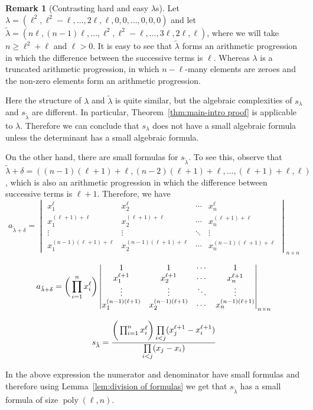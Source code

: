\documentclass[10pt,a4paper]{article}
\theoremstyle{definition}
\newtheorem{remark}[theorem]{Remark}
\DeclareMathOperator{\poly}{poly}
\begin{document}
%

%
%
%
%
%
%
%

\begin{remark}[Contrasting hard and easy $\lambda$s]
\label{rem:easy-hard-lambda}
Let $\lambda = (\ell^2, \ell^2-\ell, \ldots, 2\ell, \ell, 0, 0, \ldots, 0,0,0)$ and let $\tilde{\lambda} = ( n\ell, (n-1)\ell, \ldots, \ell^2,\ell^2-\ell, \ldots, 3\ell, 2\ell, \ell)$, where we will take $n \geq \ell^2+\ell$ and $\ell>0$. It is easy to see that $\tilde{\lambda}$ forms an arithmetic progression in which the difference between the successive terms is $\ell$. Whereas $\lambda$ is a truncated arithmetic progression, in which  $n-\ell$-many elements are zeroes and the non-zero elements form an arithmetic progression. 

Here the structure of $\lambda$ and $\tilde{\lambda}$ is quite similar, but the algebraic complexities of $s_\lambda$ and $s_{\tilde{\lambda}}$ are  different. 
In particular, Theorem~\ref{thm:main-intro proof} is applicable to $\lambda$. Therefore we can conclude that $s_\lambda$ does not have a small algebraic formula unless the determinant has a small algebraic formula. 

On the other hand, there are small formulas for $s_{\tilde{\lambda}}$. To see this, observe that 
$\tilde{\lambda}+\delta= ((n-1)(\ell+1)+\ell, (n-2)(\ell+1)+\ell, \ldots, (\ell+1)+\ell, \ell)$, 
which is also an arithmetic progression in which the difference between successive terms is $\ell+1$. Therefore, we have 
\vspace{0.4cm}
$$
a_{\tilde{\lambda}+\delta}=
\begin{vmatrix}x_1^\ell&x_2^\ell&\cdots&x_n^\ell\\x_1^{(\ell+1)+\ell}&x_2^{(\ell+1)+\ell}&\cdots&x_n^{(\ell+1)+\ell}\\\vdots&\vdots&\ddots&\vdots\\x_1^{(n-1)(\ell+1)+\ell}&x_2^{(n-1)(\ell+1)+\ell}&\cdots&x_n^{(n-1)(\ell+1)+\ell}\end{vmatrix}_{n\times n}
$$

\vspace{0.4cm}
$$
a_{\tilde{\lambda}+\delta}= \bigg{(} \prod_{i=1}^{n} x_i^{\ell}\bigg{)}
\begin{vmatrix}1&1&\cdots&1\\x_1^{\ell+1}&x_2^{\ell+1}&\cdots&x_n^{\ell+1}\\\vdots&\vdots&\ddots&\vdots\\x_1^{(n-1)(\ell+1)}&x_2^{(n-1)(\ell+1)}&\cdots&x_n^{(n-1)(\ell+1)}\end{vmatrix}_{n\times n}
$$  

\begin{align*}
s_{\tilde{\lambda}} &= \frac{\bigg{(} \prod_{i=1}^{n} x_i^{\ell}\bigg{)} \prod\limits_{\substack{i<j}} (x_j^{\ell+1}-x_i^{\ell+1})}{\prod\limits_{\substack{i<j}} (x_j-x_i)}\\
\end{align*}

In the above expression the numerator and denominator have small formulas and therefore using Lemma~\ref{lem:division of formulas} we get that $s_{\tilde{\lambda}}$ has a small formula of size $\poly(\ell,n)$.
\end{remark}
\end{document}
